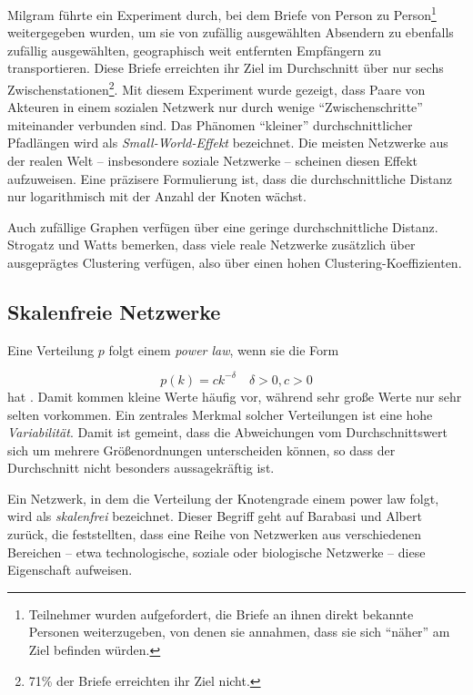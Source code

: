 Milgram führte ein Experiment durch, bei dem Briefe von Person zu
Person\footnote{Teilnehmer wurden aufgefordert, die Briefe an ihnen
  direkt bekannte Personen weiterzugeben, von denen sie annahmen, dass
  sie sich ``näher'' am Ziel befinden würden.} weitergegeben
wurden, um sie von zufällig ausgewählten Absendern zu ebenfalls
zufällig ausgewählten, geographisch weit entfernten Empfängern
zu transportieren\cite{Travers1969}. Diese Briefe erreichten ihr Ziel
im Durchschnitt über nur sechs Zwischenstationen\footnote{71\% der
  Briefe erreichten ihr Ziel nicht.}. Mit diesem Experiment wurde
gezeigt, dass Paare von Akteuren in einem sozialen Netzwerk nur durch
wenige ``Zwischenschritte'' miteinander verbunden sind. Das Phänomen
``kleiner'' durchschnittlicher Pfadlängen wird als
\emph{Small-World-Effekt} bezeichnet. Die meisten Netzwerke aus der
realen Welt -- insbesondere soziale Netzwerke -- scheinen diesen
Effekt aufzuweisen\cite{newman:167}. Eine präzisere Formulierung
ist, dass die durchschnittliche Distanz nur logarithmisch mit der
Anzahl der Knoten wächst.

Auch zufällige Graphen verfügen über eine geringe
durchschnittliche Distanz. Strogatz und Watts bemerken, dass viele
reale Netzwerke zusätzlich über ausgeprägtes Clustering
verfügen, also über einen hohen
Clustering-Koeffizienten\cite{Watts1998}.

\subsection{Skalenfreie Netzwerke}
\label{sec:skal-netzw}

Eine Verteilung $p$ folgt einem \emph{power law}, wenn sie die Form

\begin{equation}
  \label{eq:8}
  p(k) = ck^{-\delta} \quad \delta > 0, c > 0
\end{equation}
hat \cite{Baumann2004}. Damit kommen kleine Werte häufig vor,
während sehr große Werte nur sehr selten vorkommen.  Ein zentrales
Merkmal solcher Verteilungen ist eine hohe
\emph{Variabilität}. Damit ist gemeint, dass die Abweichungen vom
Durchschnittswert sich um mehrere Größenordnungen unterscheiden
können, so dass der Durchschnitt nicht besonders aussagekräftig
ist.

Ein Netzwerk, in dem die Verteilung der Knotengrade einem power law
folgt, wird als \emph{skalenfrei} bezeichnet. Dieser Begriff geht auf
Barabasi und Albert zurück, die feststellten, dass eine Reihe von
Netzwerken aus verschiedenen Bereichen -- etwa technologische, soziale
oder biologische Netzwerke -- diese Eigenschaft
aufweisen\cite{Barabasi1999}.


